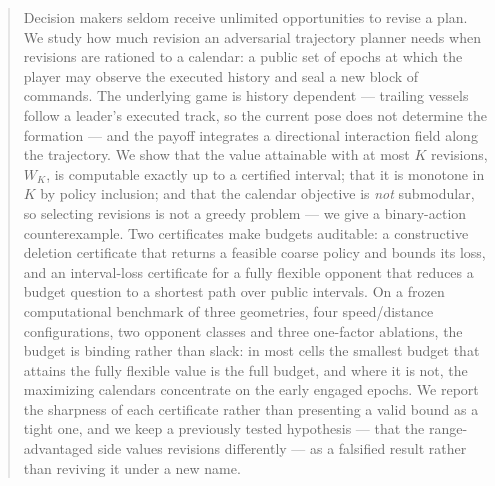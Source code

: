 \begin{abstract}
Decision makers seldom receive unlimited opportunities to revise a plan. We
study how much revision an adversarial trajectory planner needs when revisions
are rationed to a calendar: a public set of epochs at which the player may
observe the executed history and seal a new block of commands. The underlying
game is history dependent --- trailing vessels follow a leader's executed
track, so the current pose does not determine the formation --- and the payoff
integrates a directional interaction field along the trajectory.
We show that the value attainable with at most $K$ revisions, $W_K$, is
computable exactly up to a certified interval; that it is monotone in $K$ by
policy inclusion; and that the calendar objective is \emph{not} submodular, so
selecting revisions is not a greedy problem --- we give a binary-action
counterexample. Two certificates make budgets auditable: a constructive
deletion certificate that returns a feasible coarse policy and bounds its loss,
and an interval-loss certificate for a fully flexible opponent that reduces a
budget question to a shortest path over public intervals. On a frozen
computational benchmark of three geometries, four speed/distance
configurations, two opponent classes and three one-factor ablations, the
budget is binding rather than slack: in most cells the smallest budget that
attains the fully flexible value is the full budget, and where it is not, the
maximizing calendars concentrate on the early engaged epochs. We report the
sharpness of each certificate rather than presenting a valid bound as a tight
one, and we keep a previously tested hypothesis --- that the range-advantaged
side values revisions differently --- as a falsified result rather than
reviving it under a new name.
\end{abstract}
